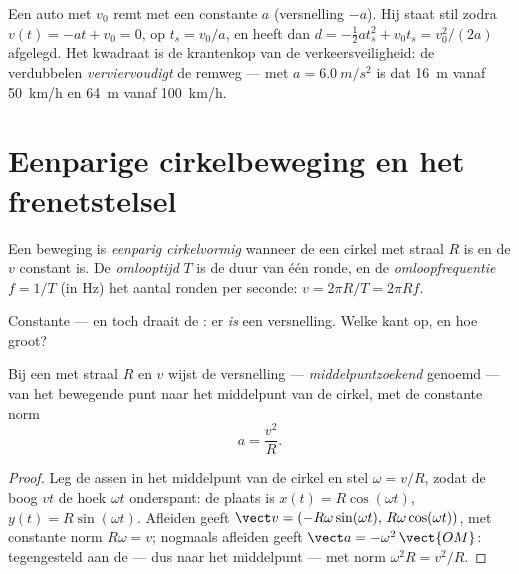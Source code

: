 \begin{example}[Remweg]\label{ex:g12:kinematics-2d:braking}
Een auto met  $v_0$ remt met een constante  $a$
(versnelling $-a$). Hij staat stil zodra $v(t) = -a t + v_0 = 0$, op
$t_s = v_0/a$, en heeft dan
$d = -\tfrac12 a t_s^2 + v_0 t_s = v_0^2/(2a)$ afgelegd. Het kwadraat is
de krantenkop van de verkeersveiligheid: de  verdubbelen
\emph{verviervoudigt} de remweg --- met $a = \qty{6.0}{m/s^2}$ is dat
\qty{16}{m} vanaf \qty{50}{km/h} en \qty{64}{m} vanaf \qty{100}{km/h}.
\end{example}

\section{Eenparige cirkelbeweging en het frenetstelsel}

\begin{definition}\label{def:g12:kinematics-2d:ucm}
Een beweging is \emph{eenparig cirkelvormig} wanneer de  een cirkel met straal $R$ is en de
 $v$ constant is. De \emph{omlooptijd} $T$ is de
duur van één ronde, en de \emph{omloopfrequentie}
$f = 1/T$ (in \unit{Hz}) het aantal ronden per seconde:
$v = 2\pi R/T = 2\pi R f$.
\end{definition}

Constante  --- en toch draait de : er \emph{is} een
versnelling. Welke kant op, en hoe groot?

\begin{theorem}\label{thm:g12:kinematics-2d:centripetal}
%
Bij een  met straal $R$ en  $v$ wijst de
versnelling --- \emph{middelpuntzoekend} genoemd --- van het bewegende
punt naar het middelpunt van de cirkel, met de constante norm
\[
a = \frac{v^2}{R}.
\]
\end{theorem}

\begin{proof}
Leg de assen in het middelpunt van de cirkel en stel $\omega = v/R$,
zodat de boog $v t$ de hoek $\omega t$ onderspant: de plaats is
$x(t) = R\cos(\omega t)$, $y(t) = R\sin(\omega t)$. Afleiden geeft
$\vect v = (-R\omega\sin(\omega t),\, R\omega\cos(\omega t))$, met
constante norm $R\omega = v$; nogmaals afleiden geeft
$\vect a = -\omega^2\,\vect{OM}$: tegengesteld aan de  ---
dus naar het middelpunt --- met norm $\omega^2 R = v^2/R$.
\end{proof}

